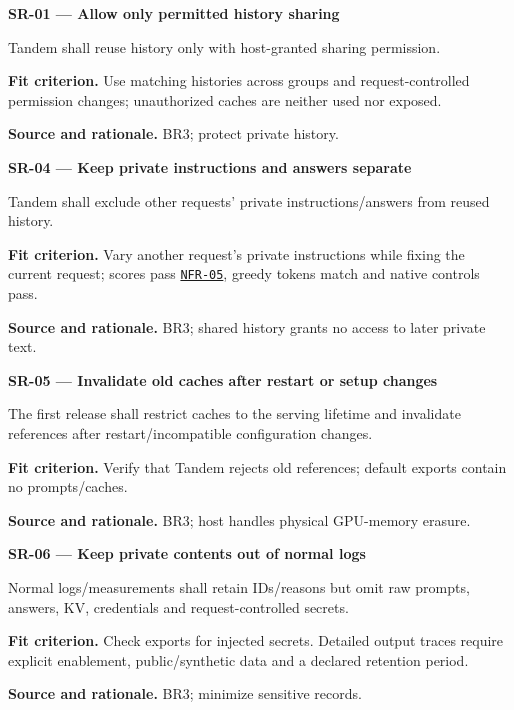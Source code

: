 \documentclass[12pt]{article}
\begin{document}
\par\medskip\noindent{}\label{req:SR-01}
\textbf{SR-01 --- Allow only permitted history sharing}\par
Tandem shall reuse history only with host-granted sharing permission.\par
\textbf{Fit criterion.} Use matching histories across groups and request-controlled permission changes; unauthorized caches are neither used nor exposed.\par
\textbf{Source and rationale.} BR3; protect private history.

\par\medskip\noindent{}\label{req:SR-04}
\textbf{SR-04 --- Keep private instructions and answers separate}\par
Tandem shall exclude other requests' private instructions/answers from reused history.\par
\textbf{Fit criterion.} Vary another request's private instructions while fixing the current request; scores pass \hyperref[req:NFR-05]{\texttt{NFR-05}}, greedy tokens match and native controls pass.\par
\textbf{Source and rationale.} BR3; shared history grants no access to later private text.

\par\medskip\noindent{}\label{req:SR-05}
\textbf{SR-05 --- Invalidate old caches after restart or setup changes}\par
The first release shall restrict caches to the serving lifetime and invalidate references after restart/incompatible configuration changes.\par
\textbf{Fit criterion.} Verify that Tandem rejects old references; default exports contain no prompts/caches.\par
\textbf{Source and rationale.} BR3; host handles physical GPU-memory erasure.

\par\medskip\noindent{}\label{req:SR-06}
\textbf{SR-06 --- Keep private contents out of normal logs}\par
Normal logs/measurements shall retain IDs/reasons but omit raw prompts, answers, KV, credentials and request-controlled secrets.\par
\textbf{Fit criterion.} Check exports for injected secrets. Detailed output traces require explicit enablement, public/synthetic data and a declared retention period.\par
\textbf{Source and rationale.} BR3; minimize sensitive records.
\end{document}
